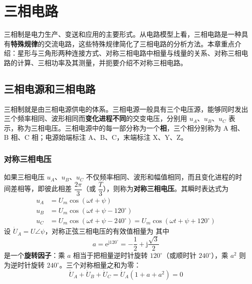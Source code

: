 \chapter{三相电路}

\noindent
三相制是电力生产、变送和应用的主要形式。从电路模型上看，三相电路是一种具有\textbf{特殊规律}的交流电路，这些特殊规律简化了三相电路的分析方法。本章重点介绍：星形与三角形两种连接方式、对称三相电路中相量与线量的关系、对称三相电路的计算、三相功率及其测量，并扼要介绍不对称三相电路。

\section{三相电源和三相电路}
三相制就是由三相电源供电的体系。三相电源一般具有三个电压源，能够同时发出三个频率相同、波形相同而\textbf{变化进程不同}的交变电压，分别用 $u_A$、$u_B$、$u_C$ 表示，称为三相电压。三相电源中的每一部分称为一个\textbf{相}，三个相分别称为 A 相、B 相、C 相；电源始端标注 A、B、C，末端标注 X、Y、Z。

\subsection{对称三相电压}
如果三相电压 $u_A$、$u_B$、$u_C$ 不仅频率相同、波形和幅值相同，而且变化进程的时间差相等，即彼此相差 $\dfrac{2\pi}{3}$（或 $\dfrac{T}{3}$），则称为\textbf{对称三相电压}。其瞬时表达式为
\begin{equation}
\begin{aligned}
u_A&=U_m\cos\left(\omega t+\psi\right)\\
u_B&=U_m\cos\left(\omega t+\psi-120^\circ\right)\\
u_C&=U_m\cos\left(\omega t+\psi-240^\circ\right)=U_m\cos\left(\omega t+\psi+120^\circ\right)
\end{aligned}
\end{equation}
设 $\dot{U}_A=U\angle\psi$，对称正弦三相电压的有效值相量为
其中
\begin{equation}
a=\mathrm{e}^{\mathrm{j}120^\circ}=-\frac{1}{2}+\mathrm{j}\frac{\sqrt{3}}{2}
\end{equation}
是一个\textbf{旋转因子}：乘 $a$ 相当于把相量逆时针旋转 $120^\circ$（或顺时针 $240^\circ$），乘 $a^2$ 则为逆时针旋转 $240^\circ$。三个对称相量之和为零：
\begin{equation}
\dot{U}_A+\dot{U}_B+\dot{U}_C=\dot{U}_A\left(1+a+a^2\right)=0
\end{equation}


